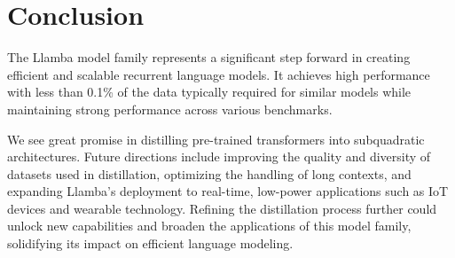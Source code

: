 \section{Conclusion}

The Llamba model family represents a significant step forward in creating efficient and scalable recurrent language models. It achieves high performance with less than 0.1\% of the data typically required for similar models while maintaining strong performance across various benchmarks.

We see great promise in distilling pre-trained transformers into subquadratic architectures. Future directions include improving the quality and diversity of datasets used in distillation, optimizing the handling of long contexts, and expanding Llamba’s deployment to real-time, low-power applications such as IoT devices and wearable technology. Refining the distillation process further could unlock new capabilities and broaden the applications of this model family, solidifying its impact on efficient language modeling.